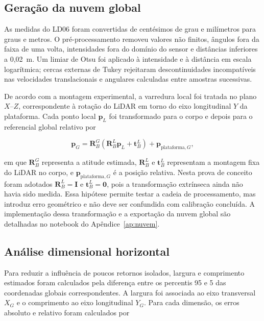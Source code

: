 \subsection{Geração da nuvem global}

As medidas do LD06 foram convertidas de centésimos de grau e milímetros para graus e metros. O pré-processamento removeu valores não finitos, ângulos fora da faixa de uma volta, intensidades fora do domínio do sensor e distâncias inferiores a 0,02~m. Um limiar de Otsu foi aplicado à intensidade e à distância em escala logarítmica; cercas externas de Tukey rejeitaram descontinuidades incompatíveis nas velocidades translacionais e angulares calculadas entre amostras sucessivas.

De acordo com a montagem experimental, a varredura local foi tratada no plano $X$--$Z$, correspondente à rotação do LiDAR em torno do eixo longitudinal $Y$ da plataforma. Cada ponto local $\mathbf{p}_L$ foi transformado para o corpo e depois para o referencial global relativo por

\begin{equation}
    \mathbf{p}_G =
    \mathbf{R}_{B}^{G}
    \left(\mathbf{R}_{B}^{L}\mathbf{p}_L + \mathbf{t}_{B}^{L}\right)
    + \mathbf{p}_{\mathrm{plataforma},G},
    \label{eq:transformacao_global}
\end{equation}

em que $\mathbf{R}_{B}^{G}$ representa a atitude estimada, $\mathbf{R}_{B}^{L}$ e $\mathbf{t}_{B}^{L}$ representam a montagem fixa do LiDAR no corpo, e $\mathbf{p}_{\mathrm{plataforma},G}$ é a posição relativa. Nesta prova de conceito foram adotados $\mathbf{R}_{B}^{L}=\mathbf{I}$ e $\mathbf{t}_{B}^{L}=\mathbf{0}$, pois a transformação extrínseca ainda não havia sido medida. Essa hipótese permite testar a cadeia de processamento, mas introduz erro geométrico e não deve ser confundida com calibração concluída. A implementação dessa transformação e a exportação da nuvem global são detalhadas no notebook do Apêndice~\ref{ap:nuvem}.

\subsection{Análise dimensional horizontal}

Para reduzir a influência de poucos retornos isolados, largura e comprimento estimados foram calculados pela diferença entre os percentis 95 e 5 das coordenadas globais correspondentes. A largura foi associada ao eixo transversal $X_G$ e o comprimento ao eixo longitudinal $Y_G$. Para cada dimensão, os erros absoluto e relativo foram calculados por


